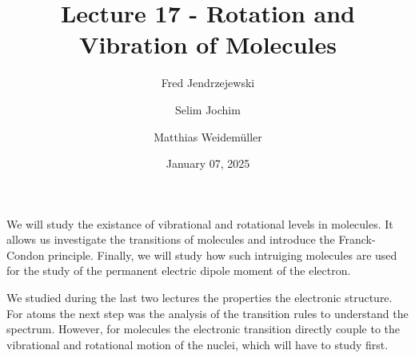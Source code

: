 \documentclass[10pt]{article}
\renewenvironment{abstract}
  {{\bfseries\noindent{\abstractname}\par\nobreak}\footnotesize}
  {\bigskip}
\begin{document}
\title{Lecture 17 - Rotation and Vibration of Molecules}



\author[1]{Fred Jendrzejewski}%
\author[2]{Selim Jochim}%
\author[2]{Matthias Weidemüller}%
%
%


\vspace{-1em}



  
  \date{January 07, 2025}


\begingroup
\let\center\flushleft
\let\endcenter\endflushleft
\maketitle
\endgroup





\begin{abstract}
We will study the existance of vibrational and rotational levels in molecules. It allows us investigate the transitions of molecules and introduce the Franck-Condon principle. Finally, we will study how such intruiging molecules are used for the study of the permanent electric dipole moment of the electron.%
\end{abstract}%



\sloppy


We studied during the last two lectures the properties the electronic structure. For atoms the next step was the analysis of the transition rules to understand the spectrum. However, for molecules the electronic transition directly couple to the vibrational and rotational motion of the nuclei, which will have to study first.
\end{document}
